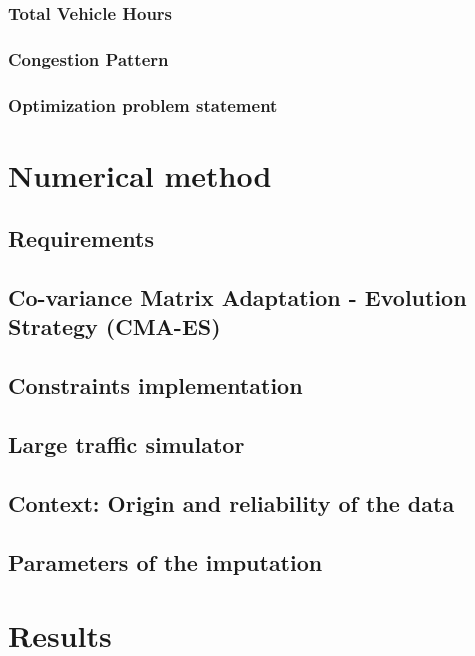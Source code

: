 \subsubsection{Total Vehicle Hours}
\label{subsubsec:tvh}

\subsubsection{Congestion Pattern}
\label{subsubsec:cp}

\subsubsection{Optimization problem statement}
\label{subsubsec:statement}



\section{Numerical method}
\subsection{Requirements}
\label{subsec:requirements}

\subsection{Co-variance Matrix Adaptation - Evolution Strategy (CMA-ES)}
\label{subsec:cmaes}

\subsection{Constraints implementation}
\label{subsec:implementation}

\subsection{Large traffic simulator}
\label{subsec:simulator}

\subsection{Context: Origin and reliability of the data}
\label{subsec:pems}


\subsection{Parameters of the imputation}
\label{subsec:parameters}







\section{Results}
\label{sec:results}


